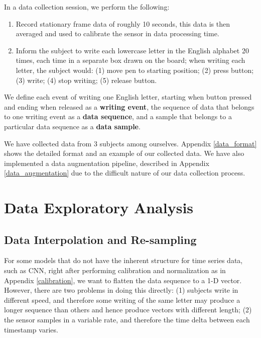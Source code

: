 \documentclass{article}
\begin{document}
In a data collection session, we perform the following:
\begin{enumerate}[topsep=0pt,itemsep=-1ex,partopsep=1ex,parsep=1ex]
    \item Record stationary frame data of roughly 10 seconds, this data is then averaged and used to calibrate the sensor in data processing time.
    \item Inform the subject to write each lowercase letter in the English alphabet 20 times, each time in a separate box drawn on the board; when writing each letter, the subject would: (1) move pen to starting position; (2) press button; (3) write; (4) stop writing; (5) release button.
\end{enumerate}

We define each event of writing one English letter, starting when button pressed and ending when released as a \textbf{writing event}, the sequence of data that belongs to one writing event as a \textbf{data sequence}, and a sample that belongs to a particular data sequence as a \textbf{data sample}.

We have collected data from 3 subjects among ourselves. Appendix \ref{data_format} shows the detailed format and an example of our collected data. We have also implemented a data augmentation pipeline, described in Appendix \ref{data_augmentation} due to the difficult nature of our data collection process.




\section{Data Exploratory Analysis}

\subsection{Data Interpolation and Re-sampling}

For some models that do not have the inherent structure for time series data, such as CNN, right after performing calibration and normalization as in Appendix \ref{calibration}, we want to flatten the data sequence to a 1-D vector. However, there are two problems in doing this directly: (1) subjects write in different speed, and therefore some writing of the same letter may produce a longer sequence than others and hence produce vectors with different length; (2) the sensor samples in a variable rate, and therefore the time delta between each timestamp varies.
\end{document}
